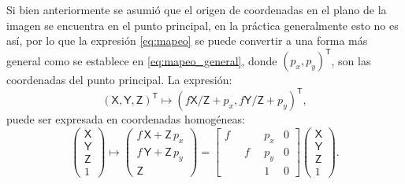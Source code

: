 Si bien anteriormente se asumió que el origen de coordenadas en el plano de la imagen se encuentra en el punto principal, en la práctica generalmente esto no es así, por lo que la expresión \ref{eq:mapeo} se puede convertir a una forma más general como se establece en \ref{eq:mapeo_general}, donde $(p_x,p_y)^\mathsf{T}$, son las coordenadas del punto principal. La expresión:
\begin{equation}
  \label{eq:mapeo_general}
  (\mathsf{X},\mathsf{Y},\mathsf{Z})^\mathsf{T} \mapsto (\mathit{f}\mathsf{X}/\mathsf{Z}+p_x, \mathit{f}\mathsf{Y}/\mathsf{Z}+p_y)^\mathsf{T},
\end{equation}
puede ser expresada en coordenadas homogéneas:
\begin{equation}
\label{eq:eq_mapeo_matricial_homogeneo}
\left(\begin{array}{c}
\mathsf{X}\\
\mathsf{Y}\\
\mathsf{Z}\\
1
\end{array}\right)\mapsto\left(\begin{array}{c}
f\, \mathsf{X} + \mathsf{Z}\, p_x\\
f\, \mathsf{Y} + \mathsf{Z}\, p_y\\
\mathsf{Z}
\end{array}\right)=\left[\begin{array}{cccc}
f & \quad & p_x & 0\\
\quad & f & p_y & 0\\
\quad & \quad & 1 & 0
\end{array}\right]\left(\begin{array}{c}
\mathsf{X}\\
\mathsf{Y}\\
\mathsf{Z}\\
1
\end{array}\right).
\end{equation}

